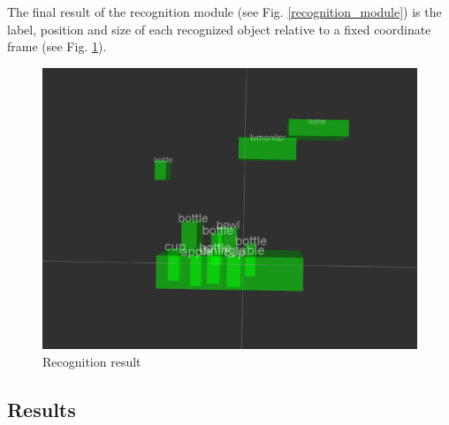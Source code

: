 \documentclass[a4paper, twocolumn]{article}
\begin{document}
    The final result of the recognition module (see Fig. \ref{recognition_module}) is the label, position and size of each recognized object relative to a fixed coordinate frame (see Fig. \ref{recognition_result}).

    \begin{figure}
        \includegraphics[width=\columnwidth]{../img/recog_markers.jpg}
        \caption{Recognition result}
        \label{recognition_result}
    \end{figure}

    \subsection{Results}
\end{document}
